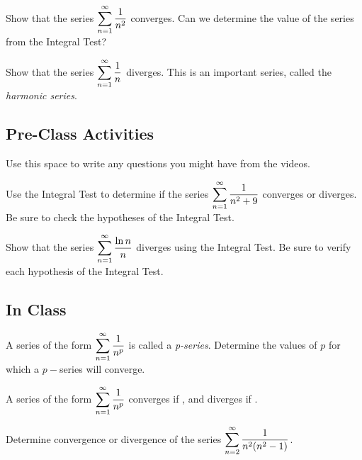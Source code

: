 \documentclass[notes]{subfiles}
\begin{document}
		\begin{ex}
			Show that the series $\displaystyle \sum_{n = 1}^\infty \dfrac{1}{n^2}$ converges.  Can we determine the value of the series from the Integral Test?
		\end{ex}
			
		\begin{ex}
			Show that the series $\displaystyle \sum_{n =1 }^\infty \dfrac{1}{n}$ diverges.  This is an important series, called the \emph{harmonic series}.
		\end{ex}
			\newpage
			
	\subsection*{Pre-Class Activities}
		\begin{ex}
			Use this space to write any questions you might have from the videos.
		\end{ex}	
			
		\begin{ex}
			Use the Integral Test to determine if the series $\displaystyle \sum_{n = 1}^\infty \dfrac{1}{n^2 + 9}$ converges or diverges.  Be sure to check the hypotheses of the Integral Test.
		\end{ex}
			
		\begin{ex}
			Show that the series $\displaystyle \sum_{n = 1}^\infty \dfrac{\ln n}{n}$ diverges using the Integral Test.  Be sure to verify each hypothesis of the Integral Test.
		\end{ex}
			\newpage
			
	\subsection*{In Class}
		
		\begin{ex}
			A series of the form $\displaystyle \sum_{n = 1}^\infty \dfrac{1}{n^p}$ is called a \emph{p-series}.  Determine the values of $p$ for which a $p-$series will converge.
		\end{ex}
			
		\begin{rmk}
			A series of the form $\displaystyle \sum_{n = 1}^\infty \dfrac{1}{n^p}$ converges if , and diverges if .
		\end{rmk}
		
		\begin{ex}
			Determine convergence or divergence of the series $\displaystyle \sum_{n = 2}^\infty \dfrac{1}{n^2(n^2-1)}$.
		\end{ex}
			\newpage
	
\end{document}
